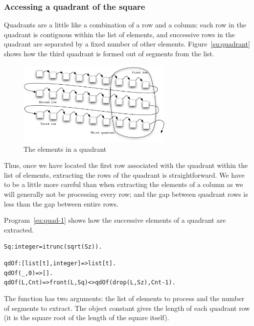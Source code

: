 \subsubsection{Accessing a quadrant of the square}
Quadrants are a little like a combination of a row and a column: each row in the quadrant is contiguous within the list of elements, and successive rows in the quadrant are separated by a fixed number of other elements. Figure~\vref{su:quadrant} shows how the third quadrant is formed out of segments from the list.
\begin{figure}[h]
\centering
\includegraphics[width=3in]{quadrant}
\caption{\label{su:quadrant}The elements in a quadrant}
\end{figure}
\noindent
Thus, once we have located the first row associated with the quadrant within the list of elements, extracting the rows of the quadrant is straightforward. We have to be a little more careful than when extracting the elements of a column as we will generally not be processing every row; and the gap between quadrant rows is less than the gap between entire rows.

Program~\vref{su:quad-1} shows how the successive elements of a quadrant are extracted.
\begin{program}
\vspace{0.5ex}
\begin{alltt}
Sq:integer = itrunc(sqrt(Sz)).

qdOf:[list[t],integer] => list[t].
qdOf(_,0)=>[].
qdOf(L,Cnt) => front(L,Sq)<>qdOf(drop(L,Sz),Cnt-1).
\end{alltt}
\vspace{-2ex}
\caption{Accessing the rows of a quadrant}
\label{su:quad-1}
\end{program}
\noindent
The  function has two arguments: the list of elements to process and the number of segments to extract. The  object constant gives the length of each quadrant row (it is the square root of the length  of the square itself).

